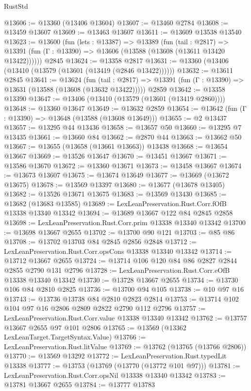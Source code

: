 \begin{lexlean}{RustStd}
\begin{coremodule}
@13606 := @13360 (@13406 @13604)
@13607 := @13460 @2784
@13608 := @13459 @13607
@13609 := @13463 @13607
@13611 := @13609 @13538 @13540
@13623 := @13600
    (fun (lets : @13387) =>
    @13389
      (fun (tail : @2817) =>
      @13391 (fun (Γ : @13390) => @13606 (@13588 (@13608 (@13611 @13420 @13422))))))
    @2845
@13624 := @13358 @2817
@13631 := @13360 (@13406 (@13410 (@13579 (@13601 (@13419 (@2846 @13422))))))
@13632 := @13611 @2845
@13641 := @13624
    (fun (tail : @2817) => @13391 (fun (Γ : @13390) => @13631 (@13588 (@13608 (@13632 @13422)))))
    @2859
@13642 := @13358 @13390
@13647 := @13406 (@13410 (@13579 (@13601 (@13419 @2860))))
@13648 := @13360 @13647
@13649 := @13632 @2859
@13654 := @13642 (fun (Γ : @13390) => @13648 (@13588 (@13608 @13649)))
@13655 := @2 @13437
@13657 := @13295 @44 @13436
@13658 := @13657 @50
@13660 := @13295 @7 @13435
@13661 := @13660 @84
@13662 := @2870 @44
@13663 := @13662 @50
@13667 := @13655 (@13658 (@13661 @13663)) @13438
@13668 := @13654 @13667
@13669 := @13526 @13647
@13670 := @13451 @13667
@13671 := @13586 @13670
@13672 := @13360 @13671
@13673 := @13458 @13667
@13674 := @13673 @13607
@13675 := @13674 @13649
@13677 := @13669 (@13672 @13675)
@13678 := @13569 @13397
@13680 := @13677 (@13678 @13405)
@13682 := @13526 @13671 @13675
@13683 := @13569 @13430
@13685 := @13682 (@13683 @13585)
@13689 := LexLeanPreservation.Rust.Corr.fOfB @13338 @13340 @13342
@13694 := @13689 @13667 @122 @84 @2845 @2858
@13698 := LexLeanPreservation.Rust.Corr.prim @13338 @13340 @13342
@13700 := @13698 @13667 @2655
@13702 := @13700 @90 @121
@13703 := @85 @86
@13708 := @13702 @13703 @84 @2845 @2856 @2848
@13712 := LexLeanPreservation.Rust.Corr.opsCons @13338 @13340 @13342
@13714 := @13712 @13667 @2655
@13724 := @13714 @106 @120 @84 @86 @2827 @2844 @2855 @2790 @131 @2796
@13728 := LexLeanPreservation.Rust.Corr.eOfB @13338 @13340 @13342
@13730 := @13728 @13667 @2655
@13734 := @13730 @106 @84 @2810 @2825
@13736 := @13700 @94 @105
@13738 := @10 @97 @16
@13743 := @13736 @13738 @84 @2810 @2823 @2814
@13753 := @13714 @102 @104 @97 @16 @2806 @2809 @2822 @2790 @112 @2796
@13757 := LexLeanPreservation.Rust.Corr.value @13338 @13340 @13342
@13762 := @13757 @13667 @2655 @97 @101 @2806
@13765 := @13569 (@13362 LexLeanTarget.TargetSyntax.Value)
@13766 := LexLeanPreservation.Rust.litValue
@13769 := @13762 (@13765 (@13766 @2806))
@13770 := @13569 @13292
@13772 := LexLeanPreservation.Rust.typedLit @13338
@13777 := @13753 (@13769 (@13770 (@13772 @101 @97)))
@13781 := LexLeanPreservation.Rust.Corr.opsNil @13338 @13340 @13342
@13783 := @13781 @13667 @2655
@13784 := @13777 @13783

\end{coremodule}
\end{lexlean}
